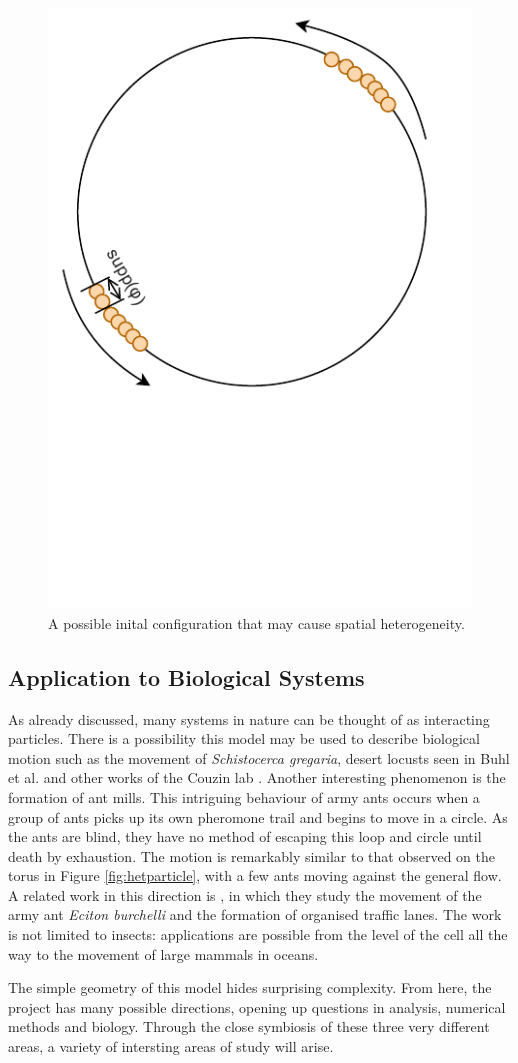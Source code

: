 \begin{figure}
    \centering
    \includegraphics[width=0.5\linewidth, trim={0 3cm 0 0}, clip]{Figures/compactphi}
    \caption[A Potential Initial Configuration]{A possible inital configuration that may cause spatial heterogeneity.}
    \label{fig:compactphi}
\end{figure}

\subsection{Application to Biological Systems}
As already discussed, many systems in nature can be thought of as interacting particles. There is a possibility this model may be used to describe biological motion such as the movement of \emph{Schistocerca gregaria}, desert locusts seen in Buhl et al.\cite{Buhl06} and other works of the Couzin lab \cite{Bazazi08,Escudero10}. Another interesting phenomenon is the formation of ant mills. This intriguing behaviour of army ants occurs when a group of ants picks up its own pheromone trail and begins to move in a circle. As the ants are blind, they have no method of escaping this loop and circle until death by exhaustion. The motion is remarkably similar to that observed on the torus in Figure \ref{fig:hetparticle}, with a few ants moving against the general flow. A related work in this direction is \cite{Couzin03}, in which they study the movement of the army ant \emph{Eciton burchelli} and the formation of organised traffic lanes. The work is not limited to insects: applications are possible from the level of the cell all the way to the movement of large mammals in oceans.


The simple geometry of this model hides surprising complexity. From here, the project has many possible directions, opening up questions in analysis, numerical methods and biology. Through the close symbiosis of these three very different areas, a variety of intersting areas of study will arise.
